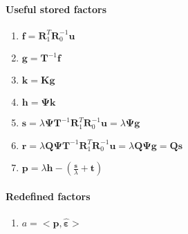 \documentclass[11pt,twoside]{report}
\begin{document}
\paragraph{Useful stored factors}
\begin{enumerate}
	\item $ \mathbf{f} = \textbf{R}_1^T\textbf{R}_0^{-1}\textbf{u} $
	\item $ \mathbf{g} = \textbf{T}^{-1}\textbf{f} $
	\item $ \mathbf{k} = \textbf{K}\mathbf{g}$
	\item $ \mathbf{h} = \boldsymbol{\Psi}\mathbf{k}$
	\item $ \mathbf{s} = \lambda \boldsymbol{\Psi} \textbf{T}^{-1} \textbf{R}_1^T\textbf{R}_0^{-1}\textbf{u} = \lambda \boldsymbol{\Psi}\mathbf{g} $
	\item $ \mathbf{r} = \lambda \textbf{Q}\boldsymbol{\Psi} \textbf{T}^{-1} \textbf{R}_1^T\textbf{R}_0^{-1}\textbf{u} = \lambda \textbf{Q}\boldsymbol{\Psi}\mathbf{g} = \textbf{Q}\mathbf{s}$
	\item $\mathbf{p} = \lambda \boldsymbol{h} -(\frac{\mathbf{s}}{\lambda} +\mathbf{t}) $
\end{enumerate}

\paragraph{Redefined factors}
\begin{enumerate}
	\item $ a = <\mathbf{p}, \hat{\mathbold{\varepsilon}}> $
\end{enumerate}

\newpage
\end{document}
